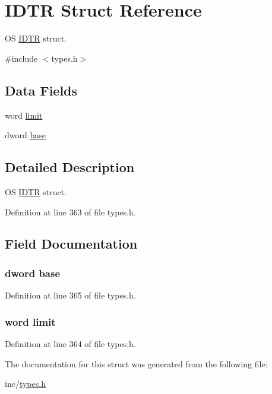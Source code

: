 \hypertarget{struct_i_d_t_r}{
\section{IDTR Struct Reference}
\label{struct_i_d_t_r}
}


OS \hyperlink{struct_i_d_t_r}{IDTR} struct.  




{\ttfamily \#include $<$types.h$>$}

\subsection*{Data Fields}
\begin{DoxyCompactItemize}
\item 
word \hyperlink{struct_i_d_t_r_ab5c3c0a36eb16002f03ae8565e505e89}{limit}
\item 
dword \hyperlink{struct_i_d_t_r_acdee40c1e899300b428fdaee620723e5}{base}
\end{DoxyCompactItemize}


\subsection{Detailed Description}
OS \hyperlink{struct_i_d_t_r}{IDTR} struct. 

Definition at line 363 of file types.h.



\subsection{Field Documentation}
\hypertarget{struct_i_d_t_r_acdee40c1e899300b428fdaee620723e5}{
\subsubsection[{base}]{\setlength{\rightskip}{0pt plus 5cm}dword {\bf base}}}
\label{struct_i_d_t_r_acdee40c1e899300b428fdaee620723e5}


Definition at line 365 of file types.h.

\hypertarget{struct_i_d_t_r_ab5c3c0a36eb16002f03ae8565e505e89}{
\subsubsection[{limit}]{\setlength{\rightskip}{0pt plus 5cm}word {\bf limit}}}
\label{struct_i_d_t_r_ab5c3c0a36eb16002f03ae8565e505e89}


Definition at line 364 of file types.h.



The documentation for this struct was generated from the following file:\begin{DoxyCompactItemize}
\item 
inc/\hyperlink{types_8h}{types.h}\end{DoxyCompactItemize}
